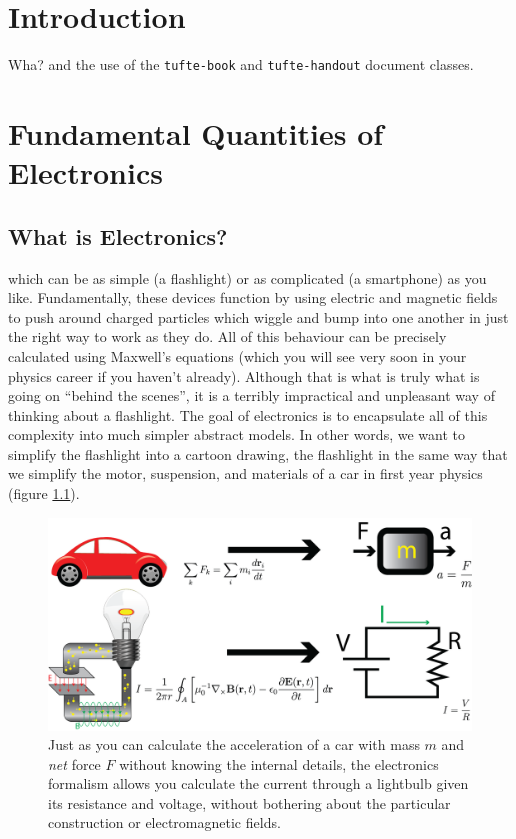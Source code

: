 \documentclass{tufte-book}
\newcommand{\doccls}[1]{\texttt{#1}}%
\begin{document}
\cleardoublepage
\chapter*{Introduction}

Wha?
and the use of the \doccls{tufte-book} and \doccls{tufte-handout} document classes.


\mainmatter


\chapter{Fundamental Quantities of Electronics}
\label{ch:fundamentals}

\section{What is Electronics?}

 which can be as simple (a flashlight) or as complicated (a smartphone) as you like. Fundamentally, these devices function by using electric and magnetic fields to push around charged particles which wiggle and bump into one another in just the right way to work as they do. All of this behaviour can be precisely calculated using Maxwell's equations (which you will see very soon in your physics career if you haven't already). Although that is what is truly what is going on ``behind the scenes'', it is a terribly impractical and unpleasant way of thinking about a flashlight. The goal of electronics is to encapsulate all of this complexity into much simpler abstract models. In other words, we want to simplify the flashlight into a cartoon drawing, the flashlight in the same way that we simplify the motor, suspension, and materials of a car in first year physics (figure \ref{fig:abstraction}).

\begin{figure}
  \includegraphics{abstraction}
  \caption{Just as you can calculate the acceleration of a car with mass $m$ and \textit{net} force $F$ without knowing the internal details, the electronics formalism allows you calculate the current through a lightbulb given its resistance and voltage, without bothering about the particular construction or electromagnetic fields.}
  \label{fig:abstraction}
\end{figure}
\end{document}
